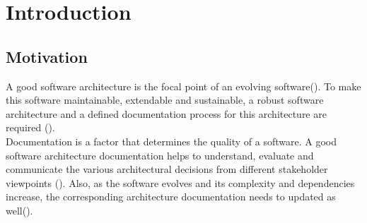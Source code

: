 \chapter{Introduction}\label{chapter:Introduction}

\section{Motivation}\label{sec:motiv}
\indent A good software architecture is the focal point of an evolving software(\cite{Garlan2011}).  To make this software maintainable, extendable and sustainable, a robust software architecture and a defined documentation process for this architecture are required (\cite{crouch_stephen_software_2013}).
\\\indent Documentation is a factor that determines the quality of a software. A good software architecture documentation helps to understand, evaluate and communicate the various architectural decisions from different stakeholder viewpoints (\cite{BachmannDocumentingSoftware2010}). Also, as the software evolves and its complexity and dependencies increase, the corresponding architecture documentation needs to updated as well(\cite{yeates_stuart_OSS_2008}).
